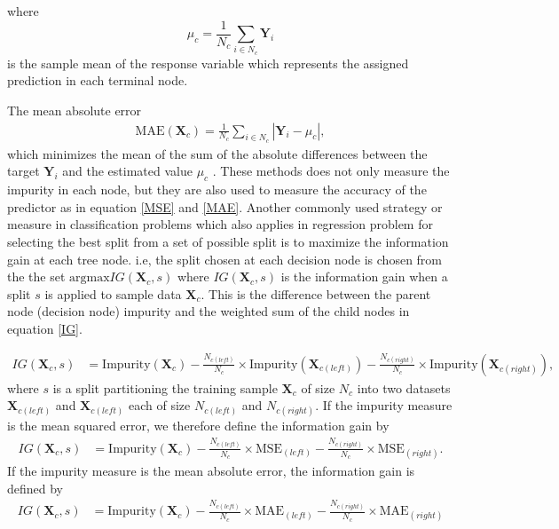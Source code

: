 where  $$\mu_{c}=\frac{1}{N_{c}} \sum_{i\in N_{c}} \textbf{Y}_{i}$$ is the sample mean of the response variable which represents the  assigned prediction in each terminal node.

The mean absolute error  
\begin{align}
\text{MAE}\left(\textbf{X}_{c} \right)=\frac{1}{N_{c}} \sum_{i\in N_{c}} \left|\textbf{Y}_{i}-\mu_{c}\right|, 
\end{align}
 which minimizes the mean of the sum of the absolute differences between the target $\textbf{Y}_{i}$ and the estimated value  $\mu_{c}$ \citep{moisen2008classification}. These methods does not only measure the impurity in each node, but they are also used to measure the accuracy of the predictor as in equation \ref{MSE} and \ref{MAE}.  Another commonly used strategy or measure in classification problems which also applies in regression problem for selecting the best split from a set of possible split is to maximize the information gain at each tree node. i.e, the split chosen at each decision node is chosen from the the set $\text{argmax} IG(\textbf{X}_{c},s)$ where $IG(\textbf{X}_{c},s)$ is the information gain when a split $s$ is applied to sample data $\textbf{X}_c$. This is the difference between the parent node (decision node) impurity and the weighted sum of the child nodes in equation \ref{IG}. 
 
 \begin{align}
 IG(\textbf{X}_c,s)&= \text{Impurity}(\textbf{X}_c)-\frac{N_{c(left)}}{N_c}\times \text{Impurity}(\textbf{X}_{c(left)})- \frac{N_{c(right)}}{N_c}\times \text{Impurity} (\textbf{X}_{c(right)}), \label{IG}
 \end{align}
 where $s$ is a split partitioning the training sample $\textbf{X}_c$ of size $N_c$ into two datasets $\textbf{X}_{c(left)}$ and $\textbf{X}_{c(left)}$ each of size $N_{c(left)}$ and $N_{c(right)}$.
If the impurity measure is the mean squared error, we therefore define the information gain by
 \begin{align}
 IG(\textbf{X}_c,s)&= \text{Impurity}(\textbf{X}_c)-\frac{N_{c(left)}}{N_c}\times \text{MSE}_{(left)}- \frac{N_{c(right)}}{N_c}\times \text{MSE}_{(right)}.
  \end{align}
If the impurity measure is the mean absolute error, the information gain is defined by   
 \begin{align}
 IG(\textbf{X}_c,s)&= \text{Impurity}(\textbf{X}_c)-\frac{N_{c(left)}}{N_c}\times \text{MAE}_{(left)}- \frac{N_{c(right)}}{N_c}\times \text{MAE}_{(right)} 
 \end{align}
 
